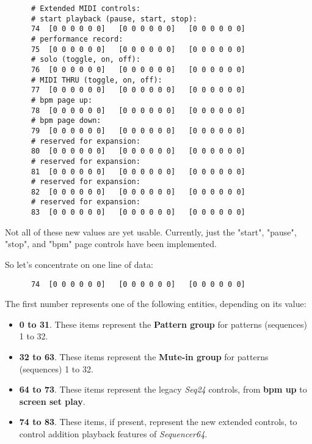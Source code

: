    \begin{verbatim}
      # Extended MIDI controls:
      # start playback (pause, start, stop):
      74  [0 0 0 0 0 0]   [0 0 0 0 0 0]   [0 0 0 0 0 0]
      # performance record:
      75  [0 0 0 0 0 0]   [0 0 0 0 0 0]   [0 0 0 0 0 0]
      # solo (toggle, on, off):
      76  [0 0 0 0 0 0]   [0 0 0 0 0 0]   [0 0 0 0 0 0]
      # MIDI THRU (toggle, on, off):
      77  [0 0 0 0 0 0]   [0 0 0 0 0 0]   [0 0 0 0 0 0]
      # bpm page up:
      78  [0 0 0 0 0 0]   [0 0 0 0 0 0]   [0 0 0 0 0 0]
      # bpm page down:
      79  [0 0 0 0 0 0]   [0 0 0 0 0 0]   [0 0 0 0 0 0]
      # reserved for expansion:
      80  [0 0 0 0 0 0]   [0 0 0 0 0 0]   [0 0 0 0 0 0]
      # reserved for expansion:
      81  [0 0 0 0 0 0]   [0 0 0 0 0 0]   [0 0 0 0 0 0]
      # reserved for expansion:
      82  [0 0 0 0 0 0]   [0 0 0 0 0 0]   [0 0 0 0 0 0]
      # reserved for expansion:
      83  [0 0 0 0 0 0]   [0 0 0 0 0 0]   [0 0 0 0 0 0]
   \end{verbatim}

   Not all of these new values are yet usable.  Currently, just the
   "start", "pause", "stop", and "bpm" page controls have been implemented.

   So let's concentrate on one line of data:

   \begin{verbatim}
      74  [0 0 0 0 0 0]   [0 0 0 0 0 0]   [0 0 0 0 0 0]
   \end{verbatim}

   The first number represents one of the following entities, depending on its
   value:

   \begin{itemize}
      \item \textbf{0 to 31}.  These items represent the \textbf{Pattern group}
         for patterns (sequences) 1 to 32.
      \item \textbf{32 to 63}.  These items represent the \textbf{Mute-in
         group} for patterns (sequences) 1 to 32.
      \item \textbf{64 to 73}.  These items represent the legacy \textsl{Seq24}
         controls, from \textbf{bpm up} to \textbf{screen set play}.
      \item \textbf{74 to 83}.  These items, if present, represent the
         new extended controls, to control addition playback features of
         \textsl{Sequencer64}.
   \end{itemize}
   
